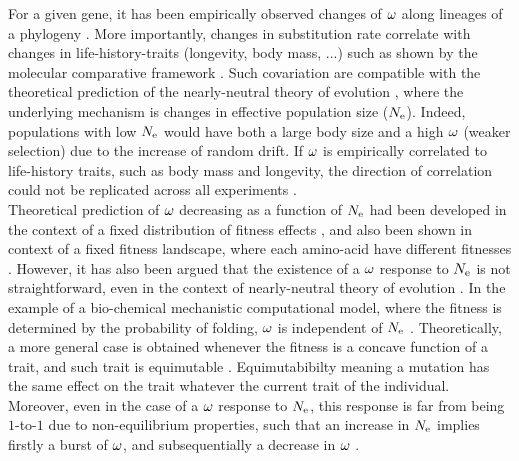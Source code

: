 \documentclass{article}
\begin{document}
For a given gene, it has been empirically observed changes of $\omega$ along lineages of a phylogeny \cite{Yang2001, Zhang2004}.
More importantly, changes in substitution rate correlate with changes in life-history-traits (longevity, body mass, ...) such as shown by the molecular comparative framework \cite{Lartillot2011,Weber2014}.
Such covariation are compatible with the theoretical prediction of the nearly-neutral theory of evolution \cite{Ohta1972, Ohta1992}, where the underlying mechanism is changes in effective population size ($N_{\mathrm{e}}$).
Indeed, populations with low $N_{\mathrm{e}}$ would have both a large body size and a high $\omega$ (weaker selection) due to the increase of random drift.
If $\omega$ is empirically correlated to life-history traits, such as body mass and longevity, the direction of correlation could not be replicated across all experiments \cite{Figuet2016}.\\

Theoretical prediction of $\omega$ decreasing as a function of $N_{\mathrm{e}}$ had been developed in the context of a fixed distribution of fitness effects \cite{Ohta1972, Welch2008}, and also been shown in context of a fixed fitness landscape, where each amino-acid have different fitnesses \cite{Spielman2015a, DosReis2015}.
However, it has also been argued that the existence of a $\omega$ response to $N_{\mathrm{e}}$ is not straightforward, even in the context of nearly-neutral theory of evolution \cite{Lanfear2014}.
In the example of a bio-chemical mechanistic computational model, where the fitness is determined by the probability of folding, $\omega$ is independent of $N_{\mathrm{e}}$ \cite{Goldstein2013}.
Theoretically, a more general case is obtained whenever the fitness is a concave function of a trait, and such trait is equimutable \cite{Cherry1998}.
Equimutabibilty meaning a mutation has the same effect on the trait whatever the current trait of the individual.
Moreover, even in the case of a $\omega$ response to $N_{\mathrm{e}}$, this response is far from being $1$-to-$1$ due to non-equilibrium properties, such that an increase in $N_{\mathrm{e}}$ implies firstly a burst of $\omega$, and subsequentially a decrease in $\omega$ \cite{Jones2016}.\\
\end{document}
